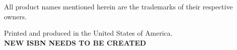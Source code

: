 \begin{minipage}[t][1.0cm][b]{\textwidth}
\begin{center}
All product names mentioned herein are the trademarks of their respective
owners.
\end{center}
\end{minipage}


\begin{minipage}[t][1.0cm][b]{\textwidth}
\begin{center}
Printed and produced in the United States of America.\\
\bf{NEW ISBN NEEDS TO BE CREATED}
\end{center}
\end{minipage}
